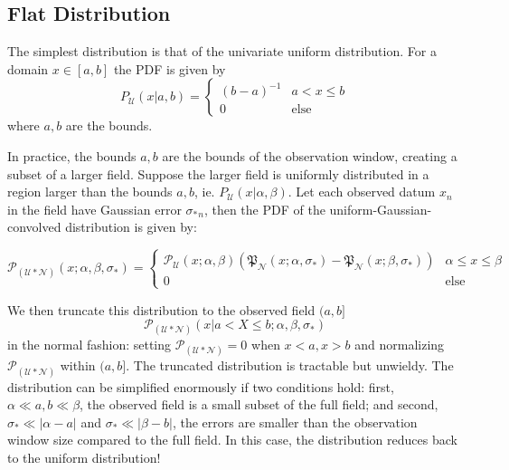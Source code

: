 \documentclass[twocolumn]{aastex631}
\newcommand{\mfk}[1]{\mathfrak{#1}}
\newcommand{\mcal}[1]{\mathcal{#1}}
\newcommand{\pdf}{\mcal{P}}
\newcommand{\cdf}{\mfk{P}}
\newcommand{\sigobs}{{\sigma_*}}
\begin{document}
    \vspace{5pt}
    \subsection{Flat Distribution} \label{sub:flat_distribution}

        The simplest distribution is that of the univariate uniform distribution.
        For a domain $x \in [a, b]$ the PDF is given by
        \begin{equation}\label{eq:pdf_flat_univariate}
            P_{\mcal{U}}(x|a,b) = \begin{cases}
                (b-a)^{-1} & a < x \leq b \\
                0 & \text{else}
            \end{cases}
        \end{equation}
        where $a,b$ are the bounds.

        In practice, the bounds $a,b$ are the bounds of the observation window, creating a subset of a larger field.
        Suppose the larger field is uniformly distributed in a region larger than the bounds $a, b$, ie. $P_{\mcal{U}}(x|\alpha,\beta)$.
        Let each observed datum $x_n$ in the field have Gaussian error $\sigobs_n$,
        then the PDF of the uniform-Gaussian-convolved distribution is given by:

        \begin{equation}
            \pdf_{(\mcal{U}*\mcal{N})}(x; \alpha, \beta, \sigobs) = \begin{cases}
                \pdf_\mcal{U}(x; \alpha, \beta) \left( \cdf_{\mcal{N}}(x; \alpha, \sigobs) - \cdf_{\mcal{N}}(x; \beta, \sigobs) \right) & \alpha \leq x \leq \beta \\
                0 & \text{else}
            \end{cases}
        \end{equation}

        We then truncate this distribution to the observed field $(a, b]$
        \begin{equation} \label{eq:pdf_flat_univariate_convolved_error_full}
            \pdf_{(\mcal{U}*\mcal{N})}(x | a < X \leq b; \alpha, \beta, \sigobs)
        \end{equation}
        in the normal fashion: setting $\pdf_{(\mcal{U}*\mcal{N})} = 0$ when $x < a, x > b$ and normalizing $\pdf_{(\mcal{U}*\mcal{N})}$ within $(a,b]$. The truncated distribution is tractable but unwieldy. The distribution can be simplified enormously if two conditions hold: first, $\alpha \ll a, b \ll \beta$, the observed field is a small subset of the full field; and second, 
        $\sigobs \ll |\alpha - a|$ and $\sigobs \ll |\beta - b|$, the errors are smaller than the observation window size compared to the full field.
        In this case, the distribution reduces back to the uniform distribution!
\end{document}

